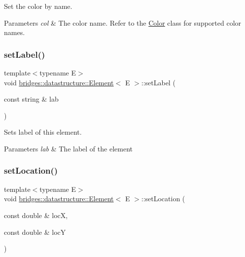 Set the color by name. 


\begin{DoxyParams}{Parameters}
{\em col} & The color name. Refer to the \hyperlink{classbridges_1_1datastructure_1_1_color}{Color} class for supported color names. \\
\hline
\end{DoxyParams}
\mbox{\label{classbridges_1_1datastructure_1_1_element_a3a1fe4e3aa100125710c30f6e401e8c3}} 
\subsubsection{\texorpdfstring{set\+Label()}{setLabel()}}
{\footnotesize\ttfamily template$<$typename E$>$ \\
void \hyperlink{classbridges_1_1datastructure_1_1_element}{bridges\+::datastructure\+::\+Element}$<$ E $>$\+::set\+Label (\begin{DoxyParamCaption}\item[{const string \&}]{lab }\end{DoxyParamCaption})\hspace{0.3cm}{\ttfamily [inline]}}



Sets label of this element. 


\begin{DoxyParams}{Parameters}
{\em lab} & The label of the element \\
\hline
\end{DoxyParams}
\mbox{\label{classbridges_1_1datastructure_1_1_element_af3af017c9d6efcbc2124d0231b57e7a6}} 
\subsubsection{\texorpdfstring{set\+Location()}{setLocation()}}
{\footnotesize\ttfamily template$<$typename E$>$ \\
void \hyperlink{classbridges_1_1datastructure_1_1_element}{bridges\+::datastructure\+::\+Element}$<$ E $>$\+::set\+Location (\begin{DoxyParamCaption}\item[{const double \&}]{locX,  }\item[{const double \&}]{locY }\end{DoxyParamCaption})\hspace{0.3cm}{\ttfamily [inline]}}



